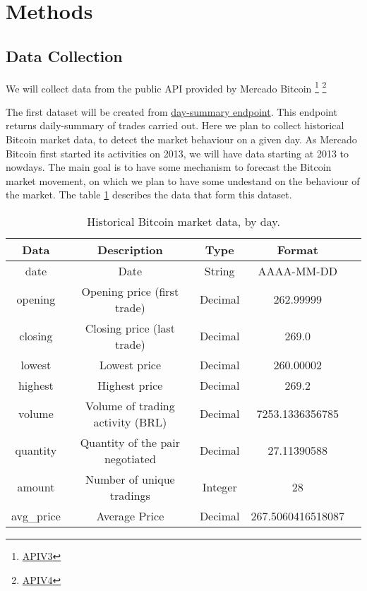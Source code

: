 \section{Methods}
\subsection{Data Collection}
\label{data:data_collection}
We will collect data from the public API provided by Mercado Bitcoin
\footnote{\href{https://www.mercadobitcoin.com.br/api-doc/\#method_trade_api_daysummary}{APIV3}}
\footnote{\href{https://api.mercadobitcoin.net/api/v4/docs\#tag/Public-Data/paths/\~1candles/get}{APIV4}}

The first dataset will be created from
\href{https://www.mercadobitcoin.com.br/api-doc/\#method_trade_api_daysummary}{day-summary endpoint}. This endpoint
returns daily-summary of trades carried out. Here we plan to collect historical Bitcoin market data, to detect the
market behaviour on a given day. As Mercado Bitcoin first started its activities on 2013, we will have data starting at
2013 to nowdays. The main goal is to have some mechanism to forecast the Bitcoin market movement, on which we plan to
have some undestand on the behaviour of the market. The table \ref{dataset1} describes the data that form this dataset.

\begin{table}[ht]
    \centering
    \caption{Historical Bitcoin market data, by day.}
    \label{dataset1}
    \setlength{\tabcolsep}{2pt}
    \small
    \begin{tabular}{|c | c | c | c | c|}
    \hline
    \multicolumn{1}{|p{2cm}}{\centering Data} & \multicolumn{1}{|p{4.8cm}}{\centering Description} &
    \multicolumn{1}{|p{2cm}}{\centering Type} & \multicolumn{1}{|p{4.8cm}|}{\centering Format} \\ \hline
    \multirow{1}{*}{\centering date} & \centering Date & String& AAAA-MM-DD\\ \hline
    \multirow{1}{*}{\centering opening} & \centering Opening price (first trade) & Decimal& 262.99999\\ \hline
    \multirow{1}{*}{\centering closing}& \centering Closing price (last trade) & Decimal & 269.0\\ \hline
    \multirow{1}{*}{\centering lowest}& \centering Lowest price & Decimal & 260.00002\\ \hline
    \multirow{1}{*}{\centering highest}& \centering Highest price & Decimal & 269.2\\ \hline
    \multirow{1}{*}{\centering volume}& \centering Volume of trading activity (BRL) & Decimal & 7253.1336356785\\ \hline
    \multirow{1}{*}{\centering quantity}& \centering Quantity of the pair negotiated & Decimal & 27.11390588\\ \hline
    \multirow{1}{*}{\centering amount}& \centering Number of unique tradings & Integer & 28\\ \hline
    \multirow{1}{*}{\centering avg\_price}& \centering Average Price & Decimal & 267.5060416518087\\ \hline
    \end{tabular}
\end{table}

